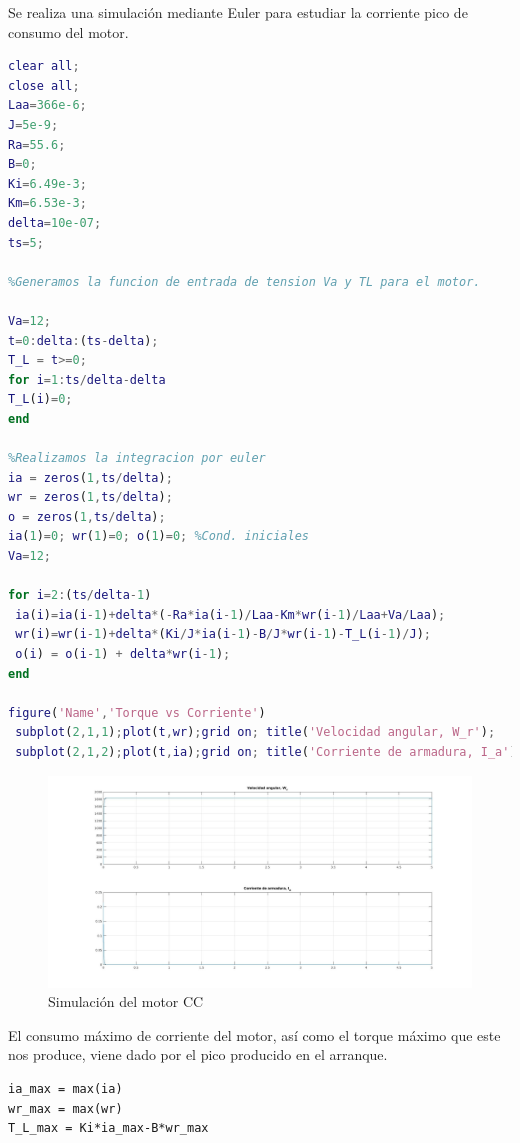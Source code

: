 \documentclass{article}
\begin{document}
Se realiza una simulación mediante Euler para estudiar la corriente pico de consumo del motor.

\begin{lstlisting}[language=matlab]    
%Asignamos los valores correspondientes al motor
clear all;
close all;
Laa=366e-6;
J=5e-9;
Ra=55.6;
B=0;
Ki=6.49e-3;
Km=6.53e-3;
delta=10e-07;
ts=5;
 
%Generamos la funcion de entrada de tension Va y TL para el motor.
 
Va=12;
t=0:delta:(ts-delta);
T_L = t>=0;
for i=1:ts/delta-delta
T_L(i)=0;
end

%Realizamos la integracion por euler
ia = zeros(1,ts/delta);
wr = zeros(1,ts/delta);
o = zeros(1,ts/delta);
ia(1)=0; wr(1)=0; o(1)=0; %Cond. iniciales
Va=12;

for i=2:(ts/delta-1)
 ia(i)=ia(i-1)+delta*(-Ra*ia(i-1)/Laa-Km*wr(i-1)/Laa+Va/Laa);
 wr(i)=wr(i-1)+delta*(Ki/J*ia(i-1)-B/J*wr(i-1)-T_L(i-1)/J);
 o(i) = o(i-1) + delta*wr(i-1);
end

figure('Name','Torque vs Corriente')
 subplot(2,1,1);plot(t,wr);grid on; title('Velocidad angular, W_r'); 
 subplot(2,1,2);plot(t,ia);grid on; title('Corriente de armadura, I_a');
\end{lstlisting}
  
\begin{figure}[!h]
  \centering
  \includegraphics[width=1\textwidth]{img/mot4-1.jpg}
  \caption{Simulación del motor CC}
\end{figure}

El consumo máximo de corriente del motor, así como el torque máximo
que este nos produce, viene dado por el pico producido en el arranque.

\begin{lstlisting}
ia_max = max(ia)
wr_max = max(wr)
T_L_max = Ki*ia_max-B*wr_max
\end{lstlisting}
\end{document}
